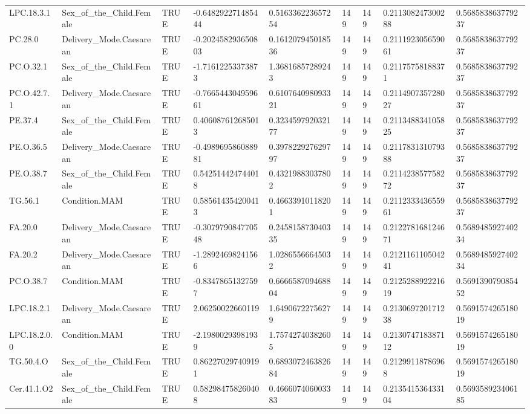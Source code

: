 \begin{longtable}{lllllllll}
LPC.18.3.1 & Sex\_of\_the\_Child.Female & TRUE & -0.648292271485444 & 0.516336223657254 & 149 & 149 & 0.211308247300288 & 0.568583863779237 \\
PC.28.0 & Delivery\_Mode.Caesarean & TRUE & -0.202458293650803 & 0.161207945018536 & 149 & 149 & 0.211192305659061 & 0.568583863779237 \\
PC.O.32.1 & Sex\_of\_the\_Child.Female & TRUE & -1.71612253373873 & 1.36816857289243 & 149 & 149 & 0.21175758188371 & 0.568583863779237 \\
PC.O.42.7.1 & Delivery\_Mode.Caesarean & TRUE & -0.766544304959661 & 0.610764098093321 & 149 & 149 & 0.211490735728027 & 0.568583863779237 \\
PE.37.4 & Sex\_of\_the\_Child.Female & TRUE & 0.406087612685013 & 0.323459792032177 & 149 & 149 & 0.211348834105825 & 0.568583863779237 \\
PE.O.36.5 & Delivery\_Mode.Caesarean & TRUE & -0.498969586088981 & 0.397822927629797 & 149 & 149 & 0.211783131079388 & 0.568583863779237 \\
PE.O.38.7 & Sex\_of\_the\_Child.Female & TRUE & 0.542514424744018 & 0.43219883037802 & 149 & 149 & 0.211423857758272 & 0.568583863779237 \\
TG.56.1 & Condition.MAM & TRUE & 0.585614354200413 & 0.46633910118201 & 149 & 149 & 0.211233343655961 & 0.568583863779237 \\
FA.20.0 & Delivery\_Mode.Caesarean & TRUE & -0.307979084770548 & 0.245815873040335 & 149 & 149 & 0.212278168124671 & 0.568948592740234 \\
FA.20.2 & Delivery\_Mode.Caesarean & TRUE & -1.28924698241566 & 1.02865566645032 & 149 & 149 & 0.212116110504241 & 0.568948592740234 \\
PC.O.38.7 & Condition.MAM & TRUE & -0.83478651327597 & 0.666658709468804 & 149 & 149 & 0.212528892221619 & 0.569139079085452 \\
LPC.18.2.1 & Delivery\_Mode.Caesarean & TRUE & 2.06250022660119 & 1.64906722756279 & 149 & 149 & 0.213069720171238 & 0.569157426518019 \\
LPC.18.2.0.0 & Condition.MAM & TRUE & -2.19800293981939 & 1.75742740382605 & 149 & 149 & 0.213074718387112 & 0.569157426518019 \\
TG.50.4.O & Sex\_of\_the\_Child.Female & TRUE & 0.862270297409191 & 0.689307246382684 & 149 & 149 & 0.21299118786968 & 0.569157426518019 \\
Cer.41.1.O2 & Sex\_of\_the\_Child.Female & TRUE & 0.582984758260408 & 0.466607406003383 & 149 & 149 & 0.213541536433104 & 0.569358923406185 \\

\end{longtable}
